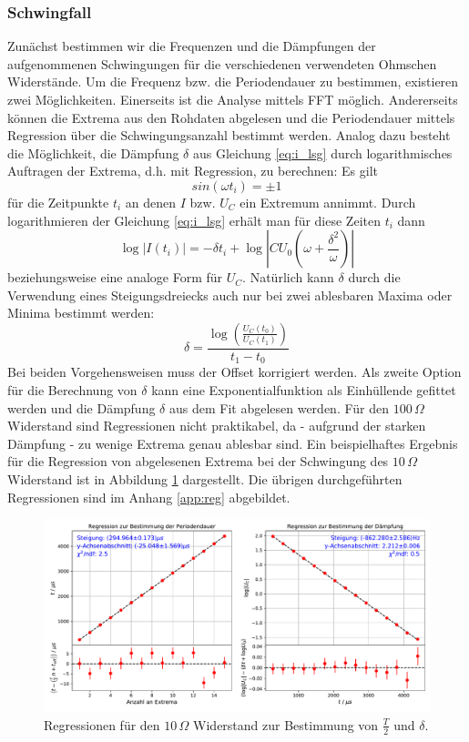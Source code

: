 \documentclass[a4paper, 12pt]{scrartcl}
\begin{document}
\subsubsection{Schwingfall}
Zunächst bestimmen wir die Frequenzen und die Dämpfungen der aufgenommenen Schwingungen für die verschiedenen verwendeten Ohmschen Widerstände. Um die Frequenz bzw. die Periodendauer zu bestimmen, existieren zwei Möglichkeiten. Einerseits ist die Analyse mittels FFT möglich. Andererseits können die Extrema aus den Rohdaten abgelesen und die Periodendauer mittels Regression über die Schwingungsanzahl bestimmt werden.
Analog dazu besteht die Möglichkeit, die Dämpfung $\delta$ aus Gleichung \ref{eq:i_lsg} durch logarithmisches Auftragen der Extrema, d.h. mit Regression, zu berechnen: Es gilt
$$sin(\omega t_i) = \pm 1$$
für die Zeitpunkte $t_i$ an denen $I$ bzw. $U_C$ ein Extremum annimmt. Durch logarithmieren der Gleichung \ref{eq:i_lsg} erhält man für diese Zeiten $t_i$ dann
$$\log \lvert I(t_i)\rvert = -\delta t_i + \log\left\lvert CU_0 \left(\omega+\frac{\delta^2}{\omega}\right)\right\rvert$$
beziehungsweise eine analoge Form für $U_C$. Natürlich kann $\delta$ durch die Verwendung eines Steigungsdreiecks auch nur bei zwei ablesbaren Maxima oder Minima bestimmt werden:
$$\delta = \frac{\log\left(\frac{U_C(t_0)}{U_C(t_1)}\right)}{t_1-t_0}$$
Bei beiden Vorgehensweisen muss der Offset korrigiert werden. Als zweite Option für die Berechnung von $\delta$ kann eine Exponentialfunktion als Einhüllende gefittet werden und die Dämpfung $\delta$ aus dem Fit abgelesen werden.
Für den $100\,\Omega$ Widerstand sind Regressionen nicht praktikabel, da - aufgrund der starken Dämpfung - zu wenige Extrema genau ablesbar sind. Ein beispielhaftes Ergebnis für die Regression von abgelesenen Extrema bei der Schwingung des $10\,\Omega$ Widerstand ist in Abbildung \ref{abb:reg1} dargestellt. Die übrigen durchgeführten Regressionen sind im Anhang \ref{app:reg} abgebildet.

\begin{figure}[h]
\centering
\includegraphics[width=\textwidth]{plots/reg_schwingung3.pdf}
\caption{Regressionen für den $10\,\Omega$ Widerstand zur Bestimmung von $\frac{T}{2}$ und $\delta$.}
\label{abb:reg1}
\end{figure}
\end{document}
